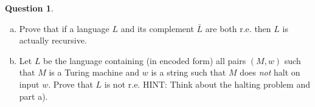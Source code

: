 \documentclass{article}
\theoremstyle{definition}
\newtheorem{Q}{Question}
\begin{document}
\begin{Q}
\mbox{}
\begin{enumerate}[a)]
\item Prove that if a language $L$ and its complement $\bar{L}$ are both r.e. then $L$ is actually recursive.
\item Let $L$ be the language containing (in encoded form) all pairs $(M, w)$ such that $M$ is a Turing machine and $w$ is a string such that $M$ does \emph{not} halt on input $w$. Prove that $L$ is not r.e. HINT: Think about the halting problem and part a).   
\end{enumerate}
\end{Q}
\begin{comment}
\textbf{Solution}
\begin{enumerate}[a)]
\item Theorem \ref{T:comps}
\item Let $L'$ be the language consisting of $L$ together with all the finite strings which are not the coded form of a Turing machine and an input. Since it is decidable whether a string is the coded form of a Turing machine and an input (by the definition of encoding), $L'$ is r.e. if and only if $L$ is r.e. Note that $L'$ is the complement of the language consisting of the codes of $(T,I)$ such that $T(I)$ halts. This is the Halting problem, which we know is semidecidable but not decidable. Since the Halting problem is semidecidable, if $L'$ were r.e. then the Halting problem would be decidable, by part a). Since this is false, $L'$ and thus $L$ cannot be r.e.
\end{enumerate}
\end{comment}
\end{document}
